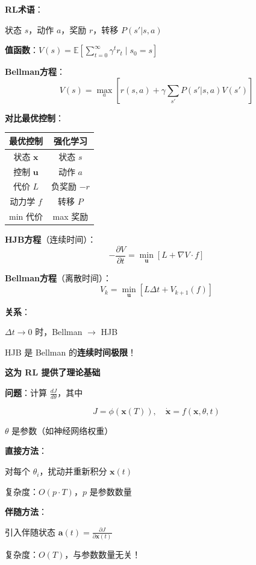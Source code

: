 \documentclass[12pt, a4paper]{ctexart}
\begin{document}
\begin{blackboard}[RL中的Bellman方程]

\textbf{RL术语}：

状态 $s$，动作 $a$，奖励 $r$，转移 $P(s'|s,a)$

\textbf{值函数}：$V(s) = \mathbb{E}\left[ \sum_{t=0}^\infty \gamma^t r_t \mid s_0 = s \right]$

\textbf{Bellman方程}：
\[
V(s) = \max_a \left[ r(s, a) + \gamma \sum_{s'} P(s'|s,a) V(s') \right]
\]

\textbf{对比最优控制}：

\begin{center}
\begin{tabular}{c|c}
最优控制 & 强化学习 \\
\hline
状态 $\mathbf{x}$ & 状态 $s$ \\
控制 $\mathbf{u}$ & 动作 $a$ \\
代价 $L$ & 负奖励 $-r$ \\
动力学 $f$ & 转移 $P$ \\
min 代价 & max 奖励
\end{tabular}
\end{center}

\end{blackboard}

\begin{blackboard}[核心联系：HJB = 连续Bellman]

\textbf{HJB方程}（连续时间）：
\[
-\frac{\partial V}{\partial t} = \min_{\mathbf{u}} \left[ L + \nabla V \cdot f \right]
\]

\textbf{Bellman方程}（离散时间）：
\[
V_k = \min_{\mathbf{u}} \left[ L \Delta t + V_{k+1}(f) \right]
\]

\textbf{关系}：

$\Delta t \to 0$ 时，Bellman $\to$ HJB

HJB 是 Bellman 的\textbf{连续时间极限}！

\textbf{这为 RL 提供了理论基础}

\end{blackboard}

\begin{blackboard}

\textbf{问题}：计算 $\frac{dJ}{d\theta}$，其中

\[
J = \phi(\mathbf{x}(T)), \quad \dot{\mathbf{x}} = f(\mathbf{x}, \theta, t)
\]

$\theta$ 是参数（如神经网络权重）

\textbf{直接方法}：

对每个 $\theta_i$，扰动并重新积分 $\mathbf{x}(t)$

复杂度：$O(p \cdot T)$，$p$ 是参数数量

\textbf{伴随方法}：

引入伴随状态 $\mathbf{a}(t) = \frac{\partial J}{\partial \mathbf{x}(t)}$

复杂度：$O(T)$，与参数数量无关！

\end{blackboard}
\end{document}
